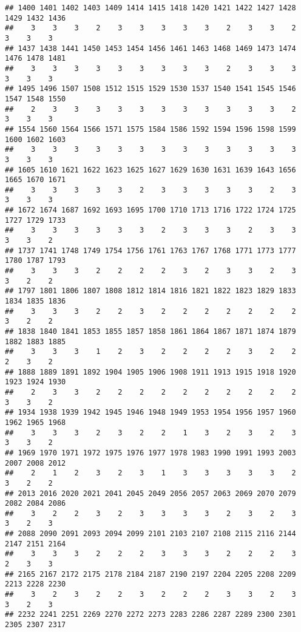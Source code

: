 \documentclass[
]{article}
\begin{document}
\begin{verbatim}
## 1400 1401 1402 1403 1409 1414 1415 1418 1420 1421 1422 1427 1428 1429 1432 1436 
##    3    3    3    2    3    3    3    3    3    2    3    3    2    3    3    3 
## 1437 1438 1441 1450 1453 1454 1456 1461 1463 1468 1469 1473 1474 1476 1478 1481 
##    3    3    3    3    3    3    3    3    3    2    3    3    3    3    3    3 
## 1495 1496 1507 1508 1512 1515 1529 1530 1537 1540 1541 1545 1546 1547 1548 1550 
##    2    3    3    3    3    3    3    3    3    3    3    3    2    3    3    3 
## 1554 1560 1564 1566 1571 1575 1584 1586 1592 1594 1596 1598 1599 1600 1602 1603 
##    3    3    3    3    3    3    3    3    3    3    3    3    3    3    3    3 
## 1605 1610 1621 1622 1623 1625 1627 1629 1630 1631 1639 1643 1656 1665 1670 1671 
##    3    3    3    3    3    2    3    3    3    3    3    2    3    3    3    3 
## 1672 1674 1687 1692 1693 1695 1700 1710 1713 1716 1722 1724 1725 1727 1729 1733 
##    3    3    3    3    3    3    2    3    3    3    2    3    3    3    3    2 
## 1737 1741 1748 1749 1754 1756 1761 1763 1767 1768 1771 1773 1777 1780 1787 1793 
##    3    3    3    2    2    2    2    3    2    3    3    2    3    3    2    2 
## 1797 1801 1806 1807 1808 1812 1814 1816 1821 1822 1823 1829 1833 1834 1835 1836 
##    3    3    3    2    2    3    2    2    2    2    2    2    2    3    2    2 
## 1838 1840 1841 1853 1855 1857 1858 1861 1864 1867 1871 1874 1879 1882 1883 1885 
##    3    3    3    1    2    3    2    2    2    2    3    2    2    2    3    2 
## 1888 1889 1891 1892 1904 1905 1906 1908 1911 1913 1915 1918 1920 1923 1924 1930 
##    2    3    3    2    2    2    2    2    2    2    2    2    2    3    3    2 
## 1934 1938 1939 1942 1945 1946 1948 1949 1953 1954 1956 1957 1960 1962 1965 1968 
##    3    3    3    2    3    2    2    1    3    2    3    2    3    3    3    2 
## 1969 1970 1971 1972 1975 1976 1977 1978 1983 1990 1991 1993 2003 2007 2008 2012 
##    2    1    2    3    2    3    1    3    3    3    3    3    2    3    2    2 
## 2013 2016 2020 2021 2041 2045 2049 2056 2057 2063 2069 2070 2079 2082 2084 2086 
##    3    2    2    3    2    3    3    3    3    2    3    2    3    3    2    3 
## 2088 2090 2091 2093 2094 2099 2101 2103 2107 2108 2115 2116 2144 2147 2151 2164 
##    3    3    3    2    2    2    3    3    3    2    2    2    3    2    3    3 
## 2165 2167 2172 2175 2178 2184 2187 2190 2197 2204 2205 2208 2209 2213 2228 2230 
##    3    2    3    2    2    3    2    2    2    3    3    2    3    3    2    3 
## 2232 2241 2251 2269 2270 2272 2273 2283 2286 2287 2289 2300 2301 2305 2307 2317 

\end{verbatim}
\end{document}
